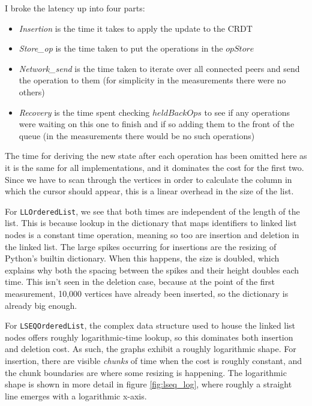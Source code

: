 \documentclass[diss.tex]{subfiles}
\begin{document}
\noindent
I broke the latency up into four parts: 
\begin{itemize}
\item \textit{Insertion} is the time it takes to apply the update to the CRDT
\item \textit{Store\_op} is the time taken to put the operations in the $opStore$
\item \textit{Network\_send} is the time taken to iterate over all connected peers and send the operation to them (for simplicity in the measurements there were no others)
\item \textit{Recovery} is the time spent checking $heldBackOps$ to see if any operations were waiting on this one to finish and if so adding them to the front of the queue (in the measurements there would be no such operations)
\end{itemize}

The time for deriving the new state after each operation has been omitted here as it is the same for all implementations, and it dominates the cost for the first two. Since we have to scan through the vertices in order to calculate the column in which the cursor should appear, this is a linear overhead in the size of the list.

For \texttt{LLOrderedList}, we see that both times are independent of the length of the list. This is because lookup in the dictionary that maps identifiers to linked list nodes is a constant time operation, meaning so too are insertion and deletion in the linked list. The large spikes occurring for insertions are the resizing of Python's builtin dictionary. When this happens, the size is doubled, which explains why both the spacing between the spikes and their height doubles each time. This isn't seen in the deletion case, because at the point of the first measurement, 10,000 vertices have already been inserted, so the dictionary is already big enough.

For \texttt{LSEQOrderedList}, the complex data structure used to house the linked list nodes offers roughly logarithmic-time lookup, so this dominates both insertion and deletion cost. As such, the graphs exhibit a roughly logarithmic shape. For insertion, there are visible \textit{chunks} of time when the cost is roughly constant, and the chunk boundaries are where some resizing is happening. The logarithmic shape is shown in more detail in figure \ref{fig:lseq_log}, where roughly a straight line emerges with a logarithmic x-axis.
\end{document}
